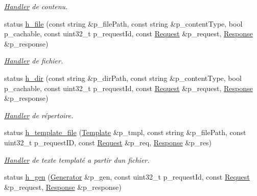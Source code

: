 \begin{DoxyCompactItemize}
\begin{DoxyCompactList}\small\item\em \hyperlink{classxtd_1_1network_1_1http_1_1Server_1_1Handler}{Handler} de contenu. \end{DoxyCompactList}\item 
status \hyperlink{classxtd_1_1network_1_1http_1_1Server_ab3525557fb71fe7ffec9bf68b61db107}{h\+\_\+file} (const string \&p\+\_\+file\+Path, const string \&p\+\_\+content\+Type, bool p\+\_\+cachable, const uint32\+\_\+t p\+\_\+request\+Id, const \hyperlink{classxtd_1_1network_1_1http_1_1Request}{Request} \&p\+\_\+request, \hyperlink{classxtd_1_1network_1_1http_1_1Response}{Response} \&p\+\_\+response)
\begin{DoxyCompactList}\small\item\em \hyperlink{classxtd_1_1network_1_1http_1_1Server_1_1Handler}{Handler} de fichier. \end{DoxyCompactList}\item 
status \hyperlink{classxtd_1_1network_1_1http_1_1Server_a7b7fb002ef005e7dd7b502c95587f4f2}{h\+\_\+dir} (const string \&p\+\_\+dir\+Path, const string \&p\+\_\+content\+Type, bool p\+\_\+cachable, const uint32\+\_\+t p\+\_\+request\+Id, const \hyperlink{classxtd_1_1network_1_1http_1_1Request}{Request} \&p\+\_\+request, \hyperlink{classxtd_1_1network_1_1http_1_1Response}{Response} \&p\+\_\+response)
\begin{DoxyCompactList}\small\item\em \hyperlink{classxtd_1_1network_1_1http_1_1Server_1_1Handler}{Handler} de répertoire. \end{DoxyCompactList}\item 
status \hyperlink{classxtd_1_1network_1_1http_1_1Server_a96229b97d8ee79a57d1ab66b7af5b32d}{h\+\_\+template\+\_\+file} (\hyperlink{classxtd_1_1network_1_1http_1_1Template}{Template} \&p\+\_\+tmpl, const string \&p\+\_\+file\+Path, const uint32\+\_\+t p\+\_\+request\+ID, const \hyperlink{classxtd_1_1network_1_1http_1_1Request}{Request} \&p\+\_\+req, \hyperlink{classxtd_1_1network_1_1http_1_1Response}{Response} \&p\+\_\+res)
\begin{DoxyCompactList}\small\item\em \hyperlink{classxtd_1_1network_1_1http_1_1Server_1_1Handler}{Handler} de texte templaté a partir d\textquotesingle{}un fichier. \end{DoxyCompactList}\item 
status \hyperlink{classxtd_1_1network_1_1http_1_1Server_a6c9d2c89310fc7aa9aba0a001dc28728}{h\+\_\+gen} (\hyperlink{classxtd_1_1network_1_1http_1_1Generator}{Generator} \&p\+\_\+gen, const uint32\+\_\+t p\+\_\+request\+Id, const \hyperlink{classxtd_1_1network_1_1http_1_1Request}{Request} \&p\+\_\+request, \hyperlink{classxtd_1_1network_1_1http_1_1Response}{Response} \&p\+\_\+response)

\end{DoxyCompactItemize}
